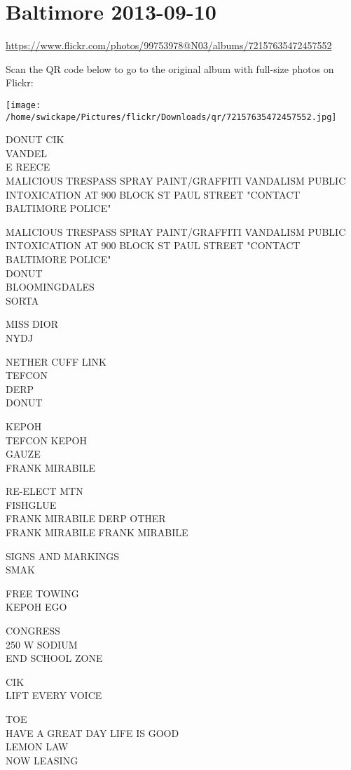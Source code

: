 \documentclass[10pt,letterpaper]{article}
\begin{document}
\section*{Baltimore 2013-09-10}

\url{https://www.flickr.com/photos/99753978@N03/albums/72157635472457552}

Scan the QR code below to go to the original album with full-size photos on Flickr:

\texttt{[image: /home/swickape/Pictures/flickr/Downloads/qr/72157635472457552.jpg]}
\pagebreak

DONUT CIK\\
VANDEL\\
E REECE\\
MALICIOUS TRESPASS SPRAY PAINT/GRAFFITI VANDALISM PUBLIC INTOXICATION AT 900 BLOCK ST PAUL STREET "CONTACT BALTIMORE POLICE"

MALICIOUS TRESPASS SPRAY PAINT/GRAFFITI VANDALISM PUBLIC INTOXICATION AT 900 BLOCK ST PAUL STREET "CONTACT BALTIMORE POLICE"\\
DONUT\\
BLOOMINGDALES\\
SORTA

MISS DIOR\\
NYDJ

NETHER CUFF LINK\\
TEFCON\\
DERP\\
DONUT

KEPOH\\
TEFCON KEPOH\\
GAUZE\\
FRANK MIRABILE

RE{-}ELECT MTN\\
FISHGLUE\\
FRANK MIRABILE DERP OTHER\\
FRANK MIRABILE FRANK MIRABILE

SIGNS AND MARKINGS\\
SMAK

FREE TOWING\\
KEPOH EGO

CONGRESS\\
250 W SODIUM\\
END SCHOOL ZONE

CIK\\
LIFT EVERY VOICE

TOE\\
HAVE A GREAT DAY LIFE IS GOOD\\
LEMON LAW\\
NOW LEASING
\end{document}
